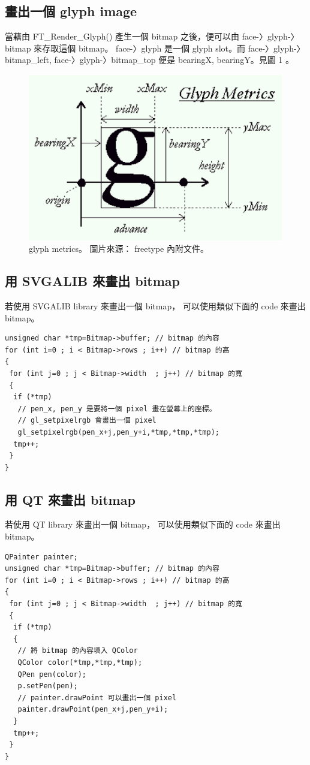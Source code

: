 \documentclass[12pt,a4]{article}
\begin{document}
\begin{CJK}{UTF8}{bsmi}
\section{畫出一個 glyph image}
當藉由 FT\_{}Render\_{}Glyph() 產生一個 bitmap 之後，便可以由 face-〉glyph-〉bitmap
來存取這個 bitmap。 face-〉glyph 是一個 glyph slot。而 face-〉glyph-〉bitmap\_{}left,
face-〉glyph-〉bitmap\_{}top 便是 bearingX, bearingY。見圖 1 。
\begin{figure}
\caption{glyph metrics。 圖片來源： freetype 內附文件。}
\begin{center}
\includegraphics[scale=0.7]{metrics.eps}
\end{center}
\end{figure}
\subsection{用 SVGALIB 來畫出 bitmap}
若使用 SVGALIB library 來畫出一個 bitmap， 可以使用類似下面的 code 來畫出 bitmap。
\begin{Verbatim}[commandchars=@\[\]]
unsigned char *tmp=Bitmap->buffer; // bitmap 的內容
for (int i=0 ; i < Bitmap->rows ; i++) // bitmap 的高
{
 for (int j=0 ; j < Bitmap->width  ; j++) // bitmap 的寬
 {
  if (*tmp)
   // pen_x, pen_y 是要將一個 pixel 畫在螢幕上的座標。
   // gl_setpixelrgb 會畫出一個 pixel
   gl_setpixelrgb(pen_x+j,pen_y+i,*tmp,*tmp,*tmp);
  tmp++;
 }
}
\end{Verbatim}

\subsection{用 QT 來畫出 bitmap}
若使用 QT library 來畫出一個 bitmap， 可以使用類似下面的 code 來畫出 bitmap。
\begin{Verbatim}[commandchars=@\[\]]
QPainter painter;
unsigned char *tmp=Bitmap->buffer; // bitmap 的內容
for (int i=0 ; i < Bitmap->rows ; i++) // bitmap 的高
{
 for (int j=0 ; j < Bitmap->width  ; j++) // bitmap 的寬
 {
  if (*tmp)
  {
   // 將 bitmap 的內容填入 QColor
   QColor color(*tmp,*tmp,*tmp);
   QPen pen(color);
   p.setPen(pen);
   // painter.drawPoint 可以畫出一個 pixel
   painter.drawPoint(pen_x+j,pen_y+i);
  }
  tmp++;
 }
}
\end{Verbatim}


\end{CJK}
\end{document}
